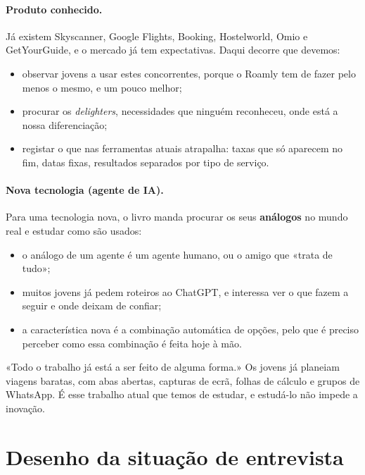 \documentclass[11pt,a4paper]{article}
\begin{document}
\paragraph{Produto conhecido.} Já existem Skyscanner, Google Flights, Booking, Hostelworld, Omio e GetYourGuide, e o mercado já tem expectativas. Daqui decorre que devemos:
\begin{itemize}[nosep]
  \item observar jovens a usar estes concorrentes, porque o Roamly tem de fazer pelo menos o mesmo, e um pouco melhor;
  \item procurar os \textit{delighters}, necessidades que ninguém reconheceu, onde está a nossa diferenciação;
  \item registar o que nas ferramentas atuais atrapalha: taxas que só aparecem no fim, datas fixas, resultados separados por tipo de serviço.
\end{itemize}

\paragraph{Nova tecnologia (agente de IA).} Para uma tecnologia nova, o livro manda procurar os seus \textbf{análogos} no mundo real e estudar como são usados:
\begin{itemize}[nosep]
  \item o análogo de um agente é um agente humano, ou o amigo que «trata de tudo»;
  \item muitos jovens já pedem roteiros ao ChatGPT, e interessa ver o que fazem a seguir e onde deixam de confiar;
  \item a característica nova é a combinação automática de opções, pelo que é preciso perceber como essa combinação é feita hoje à mão.
\end{itemize}

\begin{nota}
«Todo o trabalho já está a ser feito de alguma forma.» Os jovens já planeiam viagens baratas, com abas abertas, capturas de ecrã, folhas de cálculo e grupos de WhatsApp. É esse trabalho atual que temos de estudar, e estudá-lo não impede a inovação.
\end{nota}

\section{Desenho da situação de entrevista}
\end{document}
